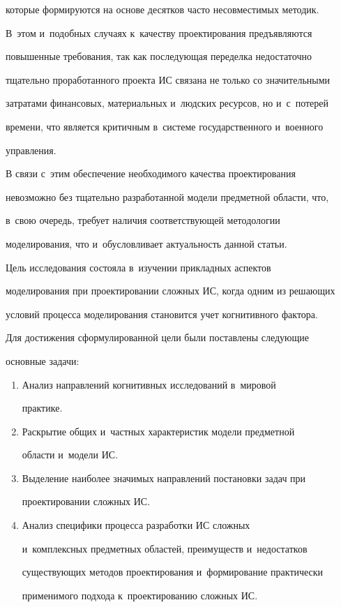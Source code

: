 которые формируются на основе десятков часто несовместимых методик. 


В~этом и~подобных случаях к~качеству проектирования предъявляются 


повышенные требования, так как последующая переделка недостаточно 


тщательно проработанного проекта ИС связана не только со значительными 


затратами финансовых, материальных и~людских ресурсов, но и~с~потерей 


времени, что является критичным в~системе государственного и~военного 


управ\-ления.


    


    В связи с~этим обеспечение необходимого качества проектирования 


невозможно без тщательно разработанной модели предметной области, что, 


в~свою очередь, требует наличия соответствующей методологии 


моделирования, что и~обусловливает актуальность данной статьи.


    


    Цель исследования состояла в~изучении прикладных аспектов 


моделирования при проектировании сложных ИС, когда одним из решающих 


условий процесса моделирования становится учет когнитивного фактора.


    


    Для достижения сформулированной цели были поставлены следующие 


основные задачи:


    \begin{enumerate}[1.]


    \item Анализ направлений когнитивных исследований в~мировой 


практике.


    \item Раскрытие общих и~частных характеристик модели предметной 


области и~модели ИС.


    \item Выделение наиболее значимых направлений постановки задач при 


проектировании сложных ИС.


    \item Анализ специфики процесса разработки ИС сложных 


и~комплексных предметных областей, преимуществ и~недостатков 


существующих методов проектирования и~формирование практически 


применимого подхода к~проектированию сложных ИС.


    \end{enumerate}





